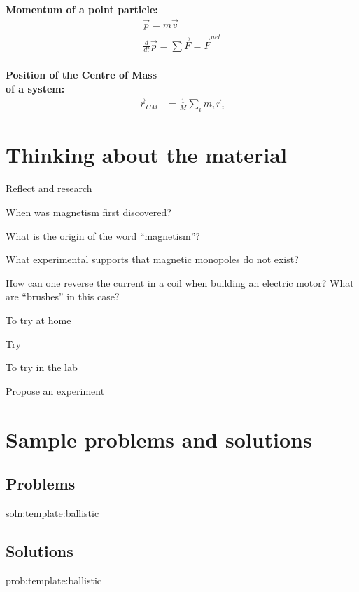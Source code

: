 \newpage
\begin{importantEquations}
\medskip
\begin{multicols}{2}
\textbf{Momentum of a point particle:}
\begin{align*}
\vec p = m\vec v \\
\frac{d}{dt}\vec p = \sum \vec F = \vec F^{net}
\end{align*}
\columnbreak
\\
\textbf{Position of the Centre of Mass \\ of a system:}
\begin{align*}
\vec r_{CM} &=\frac{1}{M}\sum_i m_i\vec r_i 
\end{align*}
\medskip
\end{multicols}
\end{importantEquations}

\newpage
\section{Thinking about the material}

\begin{chapteractivity}{Reflect and research}
{
\item When was magnetism first discovered?
\item What is the origin of the word ``magnetism''?
\item What experimental supports that magnetic monopoles do not exist?
\item How can one reverse the current in a coil when building an electric motor? What are ``brushes'' in this case?
}
\end{chapteractivity}

\begin{chapteractivity}{To try at home}
{
\item Try
}
\end{chapteractivity}

\begin{chapteractivity}{To try in the lab}
{
\item Propose an experiment
}
\end{chapteractivity}

\newpage
\section{Sample problems and solutions}
\subsection{Problems}
\begin{problem}{soln:template:ballistic}{\label{prob:template:ballistic} 

}
\end{problem}

\newpage
\subsection{Solutions}
\begin{solution}{prob:template:ballistic}\label{soln:template:ballistic}

\end{solution}

